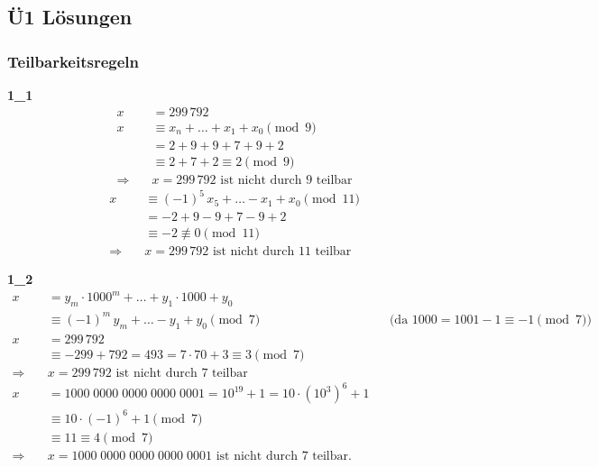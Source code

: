 \subsection{Ü1 Lösungen}

\subsubsection*{Teilbarkeitsregeln}

\begin{loesung}
\textbf{1\_1}
\begin{align*}
x &= 299\,792\\
x &\equiv x_n + \dots + x_1 + x_0 \pmod{9}\\
  &= 2 + 9 + 9 + 7 + 9 + 2\\
  &\equiv 2 + 7 + 2 \equiv 2 \pmod{9}\\
\Rightarrow\quad & x = 299\,792 \text{ ist nicht durch 9 teilbar}
\end{align*}
\begin{align*}
x &\equiv (-1)^5\, x_5 + \dots - x_1 + x_0 \pmod{11}\\
  &= -2 + 9 - 9 + 7 - 9 + 2\\
  &\equiv -2 \not\equiv 0 \pmod{11}\\
\Rightarrow\quad & x = 299\,792 \text{ ist nicht durch 11 teilbar}
\end{align*}
\end{loesung}

\begin{loesung}
\textbf{1\_2}
\begin{align*}
x &= y_m \cdot 1000^m + \dots + y_1 \cdot 1000 + y_0\\
  &\equiv (-1)^m\, y_m + \dots - y_1 + y_0 \pmod{7} && \text{(da } 1000 = 1001 - 1 \equiv -1 \pmod{7}\text{)}\\[1ex]
x &= 299\,792\\
  &\equiv -299 + 792 = 493 = 7 \cdot 70 + 3 \equiv 3 \pmod{7}\\
\Rightarrow\quad & x = 299\,792 \text{ ist nicht durch 7 teilbar}\\[1ex]
x &= 1000\;0000\;0000\;0000\;0001 = 10^{19} + 1 = 10 \cdot (10^3)^6 + 1\\
  &\equiv 10 \cdot (-1)^6 + 1 \pmod{7}\\
  &\equiv 11 \equiv 4 \pmod{7}\\
\Rightarrow\quad & x = 1000\;0000\;0000\;0000\;0001 \text{ ist nicht durch 7 teilbar.}
\end{align*}
\end{loesung}

